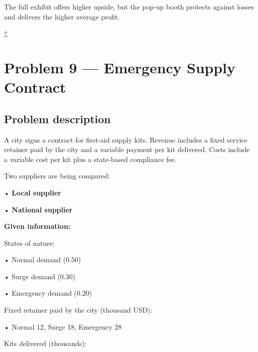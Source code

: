 \documentclass[11pt]{article}
\begin{document}
	
	
	The full exhibit offers higher upside, but the pop-up booth protects against losses and delivers the higher average profit.
	
	
	
	\hyperref[problem6-criteria]{↑}
	\section*{Problem 9 — Emergency Supply Contract}
	
	\label{problem7}
	
	\subsection*{Problem description}
	
	\label{problem7-problem}
	
	A city signs a contract for first-aid supply kits. Revenue includes a fixed service retainer paid by the city and a variable
	payment per kit delivered. Costs include a variable cost per kit plus a state-based compliance fee.
	
	
	
	
	
	
	Two suppliers are being compared:
	
	
	
	• \textbf{Local supplier}
	
	
	
	• \textbf{National supplier}
	
	
	
	
	
	\textbf{Given information:}
	
	
	
	States of nature:
	
	
	
	• Normal demand (0.50)
	
	
	
	• Surge demand (0.30)
	
	
	
	• Emergency demand (0.20)
	
	
	
	
	
	Fixed retainer paid by the city (thousand USD):
	
	
	
	• Normal 12, Surge 18, Emergency 28
	
	
	
	
	
	Kits delivered (thousands):
	
\end{document}
